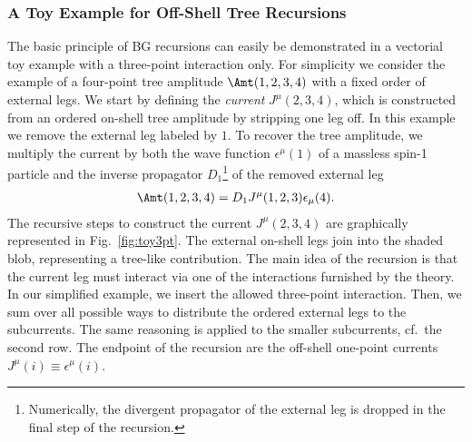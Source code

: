 \subsubsection{A Toy Example for Off-Shell Tree Recursions}
\label{sec:toybg}
The basic principle of BG recursions can easily be demonstrated in a vectorial toy
example with a three-point interaction only. For simplicity we consider the example of a
four-point tree amplitude $\Amt(1,2,3,4)$ with a fixed order of
external legs. We start by defining the \textit{current}
$J^\mu(2,3,4)$, which is constructed from an ordered on-shell tree amplitude by
stripping one leg off. In this example we remove the external leg labeled
by $1$. To recover the tree amplitude, we multiply the current by both
the wave function $\epsilon^\mu(1)$ of a massless spin-1 particle and
the inverse propagator
$D_1$\footnote{Numerically, the divergent propagator of the external
  leg is dropped in the final step of the recursion.} of the
removed external leg
\begin{align}
 \Amt(1,2,3,4)=D_1 J^\mu(1,2,3)\epsilon_\mu(4) .
\end{align}
The recursive steps to construct the current $J^\mu(2,3,4)$ are graphically represented in
Fig.~\ref{fig:toy3pt}. The external on-shell legs join into the shaded
blob, representing a tree-like contribution. The main idea of the recursion is that the current
leg must interact via one of the interactions furnished by the theory. In our simplified example, we
insert the allowed three-point interaction. Then, we sum over all
possible ways to distribute the ordered external legs to the
subcurrents. The same reasoning is applied to the smaller
subcurrents, cf.~the second row. The endpoint of the recursion are the off-shell
one-point currents $J^\mu(i)\equiv \epsilon^\mu(i)$. 

